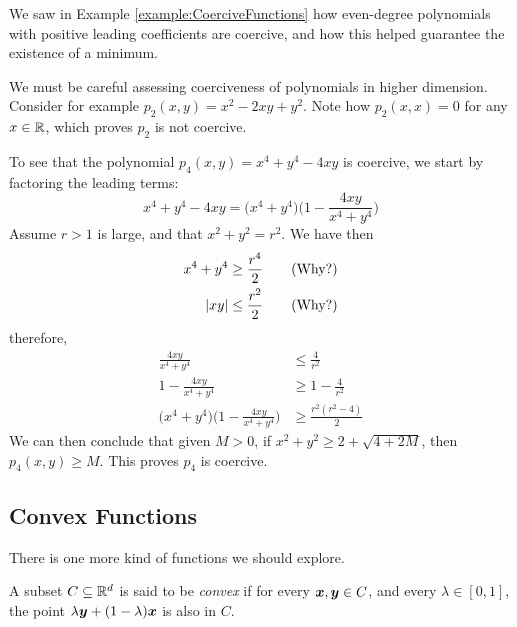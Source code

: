 \begin{example}\label{example:CoerciveFunctionsGeneral}
We saw in Example \ref{example:CoerciveFunctions} how even-degree polynomials with positive leading coefficients are coercive, and how this helped guarantee the existence of a minimum.

We must be careful assessing coerciveness of polynomials in higher dimension. Consider for example $p_2(x,y) = x^2 - 2xy + y^2$.  Note how $p_2(x,x)=0$ for any $x \in \mathbb{R}$, which proves $p_2$ is not coercive.

To see that the polynomial $p_4(x, y) = x^4 + y^4 - 4xy$ is coercive, we start by factoring the leading terms:
\begin{equation*}
x^4 + y^4 - 4xy = \big( x^4 + y^4 \big) \bigg( 1 - \frac{4xy}{x^4 + y^4} \bigg)
\end{equation*}
Assume $r>1$ is large, and that $x^2+y^2 = r^2$.  We have then
\begin{align*}
x^4 + y^4 &\geq \frac{r^4}{2} \qquad\text{(Why?)} \\
 \lvert x y \rvert &\leq \frac{r^2}{2} \qquad\text{(Why?)}
\end{align*}
therefore, 
\begin{align*}
\frac{4xy}{x^4 + y^4} &\leq \frac{4}{r^2} \\
1 - \frac{4xy}{x^4 + y^4} &\geq 1 - \frac{4}{r^2} \\
\big( x^4 + y^4 \big) \bigg( 1 - \frac{4 x y}{x^4 + y^4} \bigg) &\geq \frac{r^2(r^2-4)}{2}
\end{align*} 
We can then conclude that given $M>0$, if $x^2+y^2 \geq  2+\sqrt{4+2M}$, then $p_4(x,y) \geq M$.  This proves $p_4$ is coercive.
\end{example}

\subsection{Convex Functions}

There is one more kind of functions we should explore.

\begin{definition}\label{def:convexSets}
A subset $C \subseteq \mathbb{R}^d$ is said to be \emph{convex} if for every $\boldsymbol{x}, \boldsymbol{y} \in C$, and every $\lambda \in [0,1]$, the point $\lambda \boldsymbol{y} + (1-\lambda) \boldsymbol{x}$ is also in $C$.
\end{definition}

